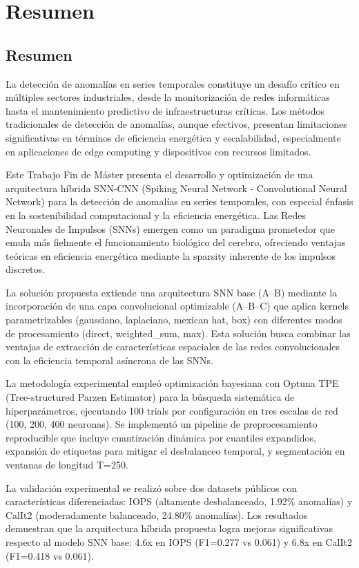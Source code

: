 \chapter{Resumen}

\section{Resumen}

La detección de anomalías en series temporales constituye un desafío crítico en múltiples sectores industriales, desde la monitorización de redes informáticas hasta el mantenimiento predictivo de infraestructuras críticas. Los métodos tradicionales de detección de anomalías, aunque efectivos, presentan limitaciones significativas en términos de eficiencia energética y escalabilidad, especialmente en aplicaciones de edge computing y dispositivos con recursos limitados.

Este Trabajo Fin de Máster presenta el desarrollo y optimización de una arquitectura híbrida SNN-CNN (Spiking Neural Network - Convolutional Neural Network) para la detección de anomalías en series temporales, con especial énfasis en la sostenibilidad computacional y la eficiencia energética. Las Redes Neuronales de Impulsos (SNNs) emergen como un paradigma prometedor que emula más fielmente el funcionamiento biológico del cerebro, ofreciendo ventajas teóricas en eficiencia energética mediante la sparsity inherente de los impulsos discretos.

La solución propuesta extiende una arquitectura SNN base (A--B) mediante la incorporación de una capa convolucional optimizable (A--B--C) que aplica kernels parametrizables (gaussiano, laplaciano, mexican hat, box) con diferentes modos de procesamiento (direct, weighted\_sum, max). Esta solución busca combinar las ventajas de extracción de características espaciales de las redes convolucionales con la eficiencia temporal asíncrona de las SNNs.

La metodología experimental empleó optimización bayesiana con Optuna TPE (Tree-structured Parzen Estimator) para la búsqueda sistemática de hiperparámetros, ejecutando 100 trials por configuración en tres escalas de red (100, 200, 400 neuronas). Se implementó un pipeline de preprocesamiento reproducible que incluye cuantización dinámica por cuantiles expandidos, expansión de etiquetas para mitigar el desbalanceo temporal, y segmentación en ventanas de longitud T=250.

La validación experimental se realizó sobre dos datasets públicos con características diferenciadas: IOPS (altamente desbalanceado, 1.92\% anomalías) y CalIt2 (moderadamente balanceado, 24.80\% anomalías). Los resultados demuestran que la arquitectura híbrida propuesta logra mejoras significativas respecto al modelo SNN base: 4.6x en IOPS (F1=0.277 vs 0.061) y 6.8x en CalIt2 (F1=0.418 vs 0.061).

